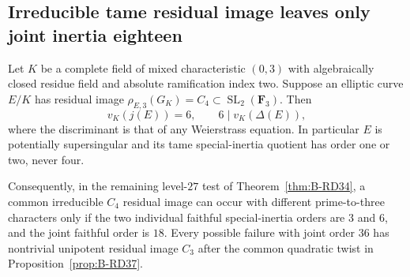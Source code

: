 \subsection{Irreducible tame residual image leaves only joint inertia eighteen}

\begin{proposition}
\label{prop:B-RD38}
Let $K$ be a complete field of mixed characteristic $(0,3)$ with
algebraically closed residue field and absolute ramification index two.
Suppose an elliptic curve $E/K$ has residual image
$\rho_{E,3}(G_K)=C_4\subset\operatorname{SL}_2(\mathbf F_3)$.
Then
\[
                  v_K(j(E))=6,
       \qquad     6\mid v_K(\Delta(E)),
                                                        \tag{B-RD38.1}
\]
where the discriminant is that of any Weierstrass equation.
In particular $E$ is potentially supersingular and its tame
special-inertia quotient has order one or two, never four.

Consequently, in the remaining level-$27$ test of
Theorem~\ref{thm:B-RD34}, a common irreducible $C_4$ residual image
can occur with different prime-to-three characters only if the two
individual faithful special-inertia orders are $3$ and $6$, and the
joint faithful order is $18$. Every possible failure with joint order
$36$ has nontrivial unipotent residual image $C_3$ after the common
quadratic twist in Proposition~\ref{prop:B-RD37}.
\end{proposition}
